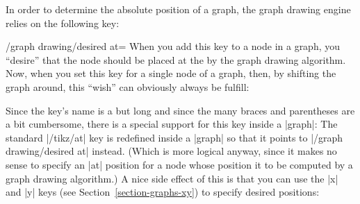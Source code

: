 {In order to determine the absolute position of a graph, the graph
drawing engine relies on the following key:

\begin{key}{/graph drawing/desired at=}
  When you add this key to a node in a graph, you ``desire'' that the
  node should be placed at the  by the graph drawing
  algorithm. Now, when you set this key for a single node of a graph,
  then, by shifting the graph around, this ``wish'' can obviously
  always be fulfill:
\begin{codeexample}[]
\end{codeexample}
\begin{codeexample}[]
\end{codeexample}
\begin{codeexample}[]
\end{codeexample}
  Since the key's name is a but long and since the many braces and
  parentheses are a bit cumbersome, there is a special support for
  this key inside a |graph|: The standard |/tikz/at| key is redefined
  inside a |graph| so that it points to |/graph drawing/desired at|
  instead. (Which is more logical anyway, since it makes no sense to
  specify an |at| position for a node whose position it to be computed
  by a graph drawing algorithm.) A nice side effect of this is that
  you can use the |x| and |y| keys (see
  Section~\ref{section-graphs-xy}) to specify desired positions:
\begin{codeexample}[]
\end{codeexample}
\begin{codeexample}[]
\end{codeexample}


\end{key}}
